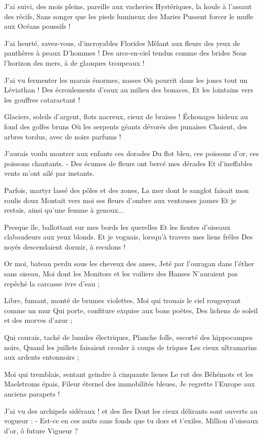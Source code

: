 J'ai suivi, des mois pleins, pareille aux vacheries
Hystériques, la houle à l'assaut des récifs,
Sans songer que les pieds lumineux des Maries
Pussent forcer le mufle aux Océans poussifs !

J'ai heurté, savez-vous, d'incroyables Florides
Mêlant aux fleurs des yeux de panthères à peaux
D'hommes ! Des arcs-en-ciel tendus comme des brides
Sous l'horizon des mers, à de glauques troupeaux !

J'ai vu fermenter les marais énormes, nasses
Où pourrit dans les joncs tout un Léviathan !
Des écroulements d'eaux au milieu des bonaces,
Et les lointains vers les gouffres cataractant !

Glaciers, soleils d'argent, flots nacreux, cieux de braises !
Échouages hideux au fond des golfes bruns
Où les serpents géants dévorés des punaises
Choient, des arbres tordus, avec de noirs parfums !

J'aurais voulu montrer aux enfants ces dorades
Du flot bleu, ces poissons d'or, ces poissons chantants.
- Des écumes de fleurs ont bercé mes dérades
Et d'ineffables vents m'ont ailé par instants.

Parfois, martyr lassé des pôles et des zones,
La mer dont le sanglot faisait mon roulis doux
Montait vers moi ses fleurs d'ombre aux ventouses jaunes
Et je restais, ainsi qu'une femme à genoux...

Presque île, ballottant sur mes bords les querelles
Et les fientes d'oiseaux clabaudeurs aux yeux blonds.
Et je voguais, lorsqu'à travers mes liens frêles
Des noyés descendaient dormir, à reculons !

Or moi, bateau perdu sous les cheveux des anses,
Jeté par l'ouragan dans l'éther sans oiseau,
Moi dont les Monitors et les voiliers des Hanses
N'auraient pas repêché la carcasse ivre d'eau ;

Libre, fumant, monté de brumes violettes,
Moi qui trouais le ciel rougeoyant comme un mur
Qui porte, confiture exquise aux bons poètes,
Des lichens de soleil et des morves d'azur ;

Qui courais, taché de lunules électriques,
Planche folle, escorté des hippocampes noirs,
Quand les juillets faisaient crouler à coups de triques
Les cieux ultramarins aux ardents entonnoirs ;

Moi qui tremblais, sentant geindre à cinquante lieues
Le rut des Béhémots et les Maelstroms épais,
Fileur éternel des immobilités bleues,
Je regrette l'Europe aux anciens parapets !

J'ai vu des archipels sidéraux ! et des îles
Dont les cieux délirants sont ouverts au vogueur :
- Est-ce en ces nuits sans fonds que tu dors et t'exiles,
Million d'oiseaux d'or, ô future Vigueur ?

